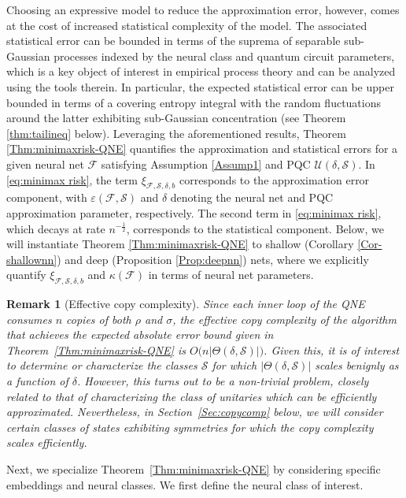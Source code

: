 \documentclass[a4paper,onecolumn,11pt,accepted=2026-05-12]{quantumarticle}
\newtheorem{remark}{Remark}
\newcommand{\cF}{\mathcal{F}}
\newcommand{\cS}{\mathcal{S}}
\newcommand{\cU}{\mathcal{U}}
\begin{document}
Choosing an expressive model to reduce the approximation error, however, comes at the cost of increased statistical  complexity of the model. The associated statistical error can be bounded in terms of the suprema of  separable sub-Gaussian processes indexed by the neural class and quantum circuit parameters, which is a key object of interest in empirical process theory and can be analyzed using the tools therein.   In particular, the expected statistical error can be upper bounded in terms of a covering entropy integral \cite[Corollary 5.25]{VanHandel-book} with the  random fluctuations around the latter exhibiting sub-Gaussian concentration \cite[Theorem 5.29]{VanHandel-book} (see Theorem \ref{thm:tailineq} below). Leveraging the aforementioned results, Theorem \ref{Thm:minimaxrisk-QNE} quantifies the approximation and statistical errors for a given neural net $\cF$  satisfying Assumption \ref{Assump1} and PQC $\cU(\delta,\cS)$.   In \eqref{eq:minimax risk},  the  term $ \xi_{\cF,\cS,\delta,b}$ corresponds to the approximation error component, with $\varepsilon(\cF,\cS)$ and $\delta$ denoting the neural net and PQC approximation parameter, respectively. The second term  in \eqref{eq:minimax risk}, which decays at rate $n^{-\frac 12}$, corresponds to the statistical  component. 
Below, we will  instantiate Theorem \ref{Thm:minimaxrisk-QNE} to shallow (Corollary \ref{Cor-shallownn}) and deep  (Proposition \ref{Prop:deepnn}) nets, where we explicitly quantify $\xi_{\cF,\cS,\delta,b}$ and $\kappa(\cF)$ in terms of neural net parameters.
\begin{remark}[Effective copy complexity]
    Since each inner loop of the QNE consumes $n$ copies of both $\rho$ and $\sigma$, the effective copy complexity of the algorithm that achieves the expected absolute error bound given in Theorem~\ref{Thm:minimaxrisk-QNE} is $O\big(n|\Theta(\delta,\cS)|\big)$. Given this, it is of interest to determine or characterize the classes  $\cS$ for which $|\Theta(\delta,\cS)|$ scales benignly as a function of $\delta$. However, this turns out to be a non-trivial problem, closely related to that of characterizing the class of unitaries which can be efficiently approximated. 
Nevertheless, in Section~\ref{Sec:copycomp} below, we will consider certain classes of  states exhibiting symmetries for which the copy complexity scales efficiently. 
\end{remark}
\medskip
Next, we specialize Theorem~\ref{Thm:minimaxrisk-QNE} by considering specific embeddings and neural classes. We first define the neural class of interest. 
\end{document}
